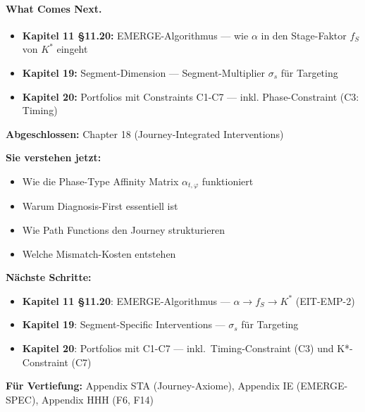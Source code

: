 \paragraph{What Comes Next.}
\begin{itemize}[nosep]
\item \textbf{Kapitel 11 §11.20:} EMERGE-Algorithmus --- wie $\alpha$ in den Stage-Faktor $f_S$ von $K^*$ eingeht
\item \textbf{Kapitel 19:} Segment-Dimension --- Segment-Multiplier $\sigma_s$ für Targeting
\item \textbf{Kapitel 20:} Portfolios mit Constraints C1-C7 --- inkl. Phase-Constraint (C3: Timing)
\end{itemize}



\begin{tcolorbox}[colback=gray!5!white, colframe=gray!75!black,
    title=Empfohlene Lesepfade]

\textbf{Abgeschlossen:} Chapter 18 (Journey-Integrated Interventions)

\textbf{Sie verstehen jetzt:}
\begin{itemize}[nosep]
\item Wie die Phase-Type Affinity Matrix $\alpha_{t,\varphi}$ funktioniert
\item Warum Diagnosis-First essentiell ist
\item Wie Path Functions den Journey strukturieren
\item Welche Mismatch-Kosten entstehen
\end{itemize}

\textbf{Nächste Schritte:}
\begin{itemize}[nosep]
\item \textbf{Kapitel 11 §11.20}: EMERGE-Algorithmus --- $\alpha \to f_S \to K^*$ (EIT-EMP-2)
\item \textbf{Kapitel 19}: Segment-Specific Interventions --- $\sigma_s$ für Targeting
\item \textbf{Kapitel 20}: Portfolios mit C1-C7 --- inkl.\ Timing-Constraint (C3) und K*-Constraint (C7)
\end{itemize}

\textbf{Für Vertiefung:} Appendix STA (Journey-Axiome), Appendix IE (EMERGE-SPEC), Appendix HHH (F6, F14)
\end{tcolorbox}


